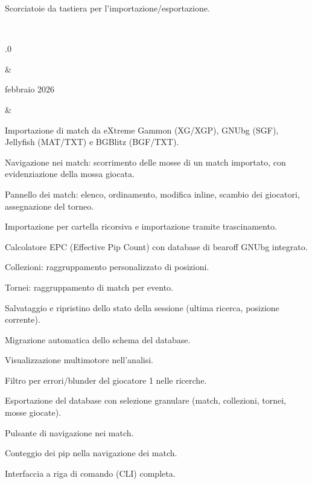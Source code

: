 \documentclass[letterpaper,10pt,italian]{sphinxmanual}
\begin{document}
\begin{savenotes}
\begin{longtable}{}
\begin{varwidth}[t]{}
\sphinxAtStartPar
Scorciatoie da tastiera per l’importazione/esportazione.
\sphinxbeforeendvarwidth
\end{varwidth}%
\\
\sphinxhline\begin{varwidth}[t]{}
.0
\sphinxbeforeendvarwidth
\end{varwidth}%
&\begin{varwidth}[t]{}
 febbraio 2026
\sphinxbeforeendvarwidth
\end{varwidth}%
&\begin{varwidth}[t]{}
\sphinxAtStartPar
Importazione di match da eXtreme Gammon (XG/XGP), GNUbg (SGF), Jellyfish (MAT/TXT) e BGBlitz (BGF/TXT).

\sphinxAtStartPar
Navigazione nei match: scorrimento delle mosse di un match importato, con evidenziazione della mossa giocata.

\sphinxAtStartPar
Pannello dei match: elenco, ordinamento, modifica inline, scambio dei giocatori, assegnazione del torneo.

\sphinxAtStartPar
Importazione per cartella ricorsiva e importazione tramite trascinamento.

\sphinxAtStartPar
Calcolatore EPC (Effective Pip Count) con database di bearoff GNUbg integrato.

\sphinxAtStartPar
Collezioni: raggruppamento personalizzato di posizioni.

\sphinxAtStartPar
Tornei: raggruppamento di match per evento.

\sphinxAtStartPar
Salvataggio e ripristino dello stato della sessione (ultima ricerca, posizione corrente).

\sphinxAtStartPar
Migrazione automatica dello schema del database.

\sphinxAtStartPar
Visualizzazione multi\sphinxhyphen{}motore nell’analisi.

\sphinxAtStartPar
Filtro per errori/blunder del giocatore 1 nelle ricerche.

\sphinxAtStartPar
Esportazione del database con selezione granulare (match, collezioni, tornei, mosse giocate).

\sphinxAtStartPar
Pulsante di navigazione nei match.

\sphinxAtStartPar
Conteggio dei pip nella navigazione dei match.

\sphinxAtStartPar
Interfaccia a riga di comando (CLI) completa.


\end{varwidth}
\end{longtable}
\end{savenotes}
\end{document}
